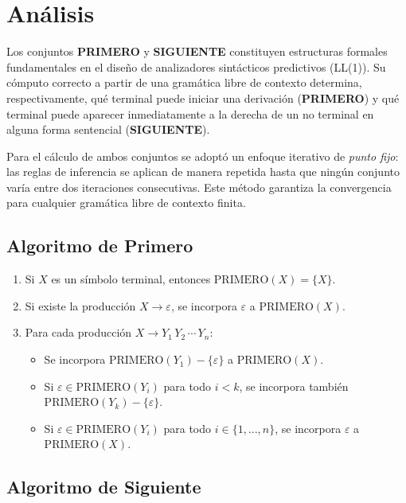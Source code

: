 \section{Análisis}

Los conjuntos \textbf{PRIMERO} y \textbf{SIGUIENTE} constituyen estructuras formales
fundamentales en el diseño de analizadores sintácticos predictivos (LL(1)). Su cómputo
correcto a partir de una gramática libre de contexto determina, respectivamente, qué terminal
puede iniciar una derivación (\textbf{PRIMERO}) y qué terminal puede aparecer inmediatamente
a la derecha de un no terminal en alguna forma sentencial (\textbf{SIGUIENTE}).

Para el cálculo de ambos conjuntos se adoptó un enfoque iterativo de \textit{punto fijo}: las
reglas de inferencia se aplican de manera repetida hasta que ningún conjunto varía entre dos
iteraciones consecutivas. Este método garantiza la convergencia para cualquier gramática libre
de contexto finita.

\subsection*{Algoritmo de Primero}

\begin{enumerate}
  \item Si $X$ es un símbolo terminal, entonces $\text{PRIMERO}(X) = \{X\}$.
  \item Si existe la producción $X \to \varepsilon$, se incorpora $\varepsilon$ a
        $\text{PRIMERO}(X)$.
  \item Para cada producción $X \to Y_1\, Y_2\, \cdots\, Y_n$:
  \begin{itemize}
    \item Se incorpora $\text{PRIMERO}(Y_1) - \{\varepsilon\}$ a $\text{PRIMERO}(X)$.
    \item Si $\varepsilon \in \text{PRIMERO}(Y_i)$ para todo $i < k$, se incorpora también
          $\text{PRIMERO}(Y_k) - \{\varepsilon\}$.
    \item Si $\varepsilon \in \text{PRIMERO}(Y_i)$ para todo $i \in \{1,\ldots,n\}$, se
          incorpora $\varepsilon$ a $\text{PRIMERO}(X)$.
  \end{itemize}
\end{enumerate}

\subsection*{Algoritmo de Siguiente}

